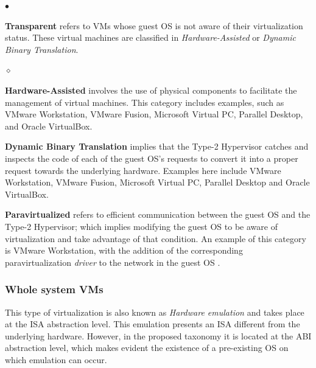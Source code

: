 	\begin{list}{$\bullet$}{\setlength{\leftmargin}{5pt}}
		
			\item \textbf{Transparent} refers to VMs whose guest OS is not aware of their virtualization status. These virtual machines are classified in \textit{Hardware-Assisted} or \textit{Dynamic Binary Translation}.
			
			\begin{list}{$\diamond$}{\setlength{\leftmargin}{8pt}}

				\item \textbf {Hardware-Assisted} involves the use of physical components to facilitate the management of virtual machines. This category includes examples, such as VMware Workstation, VMware Fusion, Microsoft Virtual PC, Parallel Desktop, and Oracle VirtualBox.
				
				\item \textbf{Dynamic Binary Translation} implies that the Type-2 Hypervisor catches and inspects the code of each of the guest OS's requests to convert it into a proper request towards the underlying hardware. Examples here include VMware Workstation, VMware Fusion, Microsoft Virtual PC, Parallel Desktop and Oracle VirtualBox.
				


			\end{list}
			
			\item \textbf {Paravirtualized} refers to efficient communication between the guest OS and the Type-2 Hypervisor; which implies modifying the guest OS to be aware of virtualization and take advantage of that condition. An example of this category is VMware Workstation, with the addition of the corresponding paravirtualization \textit{driver} to the network in the guest OS \cite {VMware2018Website}.
			
		\end{list}	

	\subsubsection{Whole system VMs}
	This type of virtualization is also known as \textit{Hardware emulation} and takes place at the ISA abstraction level.  This emulation presents an ISA different from the underlying hardware. However, in the proposed taxonomy it is located at the ABI abstraction level, which makes evident the existence of a pre-existing OS on which emulation can occur.
	
